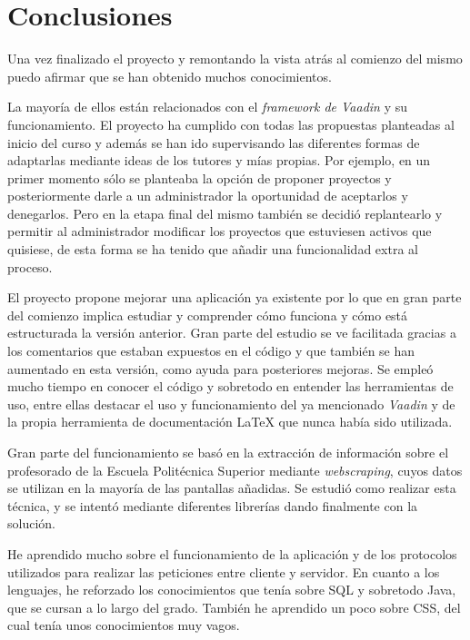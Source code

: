 
\section{Conclusiones}

Una vez finalizado el proyecto y remontando la vista atrás al comienzo del mismo puedo afirmar que se han obtenido muchos conocimientos.

La mayoría de ellos están relacionados con el \emph{framework de Vaadin} y su funcionamiento.
El proyecto ha cumplido con todas las propuestas planteadas al inicio del curso y además se han ido supervisando las diferentes formas de adaptarlas mediante ideas de los tutores y mías propias. 
Por ejemplo, en un primer momento sólo se planteaba la opción de proponer proyectos y posteriormente darle a un administrador la oportunidad de aceptarlos y denegarlos. Pero en la etapa final del mismo también se decidió replantearlo y permitir al administrador modificar los proyectos que estuviesen activos que quisiese, de esta forma se ha tenido que añadir una funcionalidad extra al proceso.

El proyecto propone mejorar una aplicación ya existente por lo que en gran parte del comienzo implica estudiar y comprender cómo funciona y cómo está estructurada la versión anterior. Gran parte del estudio se ve facilitada gracias a los comentarios que estaban expuestos en el código y que también se han aumentado en esta versión, como ayuda para posteriores mejoras.
Se empleó mucho tiempo en conocer el código y sobretodo en entender las herramientas de uso, entre ellas destacar el uso y funcionamiento del ya mencionado \emph{Vaadin} y de la propia herramienta de documentación \LaTeX{} que nunca había sido utilizada.

Gran parte del funcionamiento se basó en la extracción de información sobre el profesorado de la Escuela Politécnica Superior mediante \emph{webscraping}, cuyos datos se utilizan en la mayoría de las pantallas añadidas. Se estudió como realizar esta técnica, y se intentó mediante diferentes librerías dando finalmente con la solución.

He aprendido mucho sobre el funcionamiento de la aplicación y de los protocolos utilizados para realizar las peticiones entre cliente y servidor. En cuanto a los lenguajes, he reforzado los conocimientos que tenía sobre SQL y sobretodo Java, que se cursan a lo largo del grado. También he aprendido un poco sobre CSS, del cual tenía unos conocimientos muy vagos.

